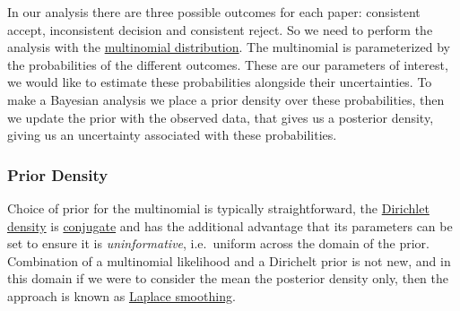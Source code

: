 \documentclass[a4paperpaper,]{article}
\begin{document}
In our analysis there are three possible outcomes for each paper:
consistent accept, inconsistent decision and consistent reject. So we
need to perform the analysis with the
\href{http://en.wikipedia.org/wiki/Multinomial_distribution}{multinomial
distribution}. The multinomial is parameterized by the probabilities of
the different outcomes. These are our parameters of interest, we would
like to estimate these probabilities alongside their uncertainties. To
make a Bayesian analysis we place a prior density over these
probabilities, then we update the prior with the observed data, that
gives us a posterior density, giving us an uncertainty associated with
these probabilities.

\hypertarget{prior-density}{%
\subsubsection{Prior Density}\label{prior-density}}

Choice of prior for the multinomial is typically straightforward, the
\href{http://en.wikipedia.org/wiki/Dirichlet_distribution}{Dirichlet
density} is
\href{http://en.wikipedia.org/wiki/Conjugate_prior}{conjugate} and has
the additional advantage that its parameters can be set to ensure it is
\emph{uninformative}, i.e.~uniform across the domain of the prior.
Combination of a multinomial likelihood and a Dirichelt prior is not
new, and in this domain if we were to consider the mean the posterior
density only, then the approach is known as
\href{http://en.wikipedia.org/wiki/Additive_smoothing}{Laplace
smoothing}.
\end{document}
